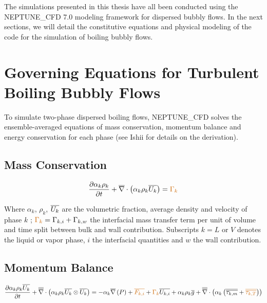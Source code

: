\npar

The simulations presented in this thesis have all been conducted using the NEPTUNE\_CFD 7.0 modeling framework for dispersed bubbly flows. In the next sections, we will detail the constitutive equations and physical modeling of the code for the simulation of boiling bubbly flows.


\section{Governing Equations for Turbulent Boiling Bubbly Flows}

To simulate two-phase dispersed boiling flows, NEPTUNE\_CFD solves the ensemble-averaged equations of mass conservation, momentum balance and energy conservation for each phase (see Ishii \cite{ishii_thermo-fluid_2011} for details on the derivation).



\subsection{Mass Conservation}
\begin{equation}
	\dtime{\alpha_{k}\rho_{k}} + \divg{\alpha_{k}\rho_{k} \vect{U_{k}}} = \orangemath{\Gamma_{k}}
	\label{eq:mass}
\end{equation}

Where $\alpha_{k}$, $\rho_{k}$, $\overline{U_{k}}$ are the volumetric fraction, average density and velocity of phase $k$ ; $\orangemath{\Gamma_{k}}=\Gamma_{k,i}+\Gamma_{k,w}$ the interfacial mass transfer term per unit of volume and time split between bulk and wall contribution.
Subscripts $k= L$ or $V$ denotes the liquid or vapor phase, $i$ the interfacial quantities and $w$ the wall contribution.

\subsection{Momentum Balance}

\begin{equation}
	\dtime{\alpha_{k}\rho_{k}\vect{U_{k}}} + \vecdivg{\alpha_{k}\rho_{k} \vect{U_{k}}\otimes \vect{U_{k}}} = -\alpha_{k}\grad{P} + \orangemath{\vect{F_{k,i}}} + \orangemath{\Gamma_{k}}\vect{U_{k,i}} + \alpha_{k}\rho_{k}\vect{g} + \vecdivg{\alpha_{k} \parth{ \tens{\tau_{k,m}} + \orangemath{\tens{\tau_{k,T}}} }}
\label{eq:momentum}
\end{equation}

